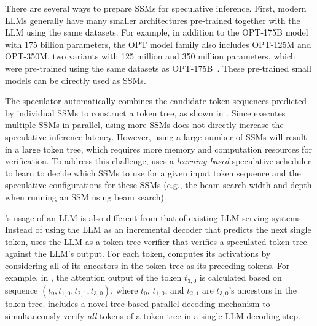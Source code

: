 There are several ways to prepare SSMs for speculative inference. 
First, modern LLMs generally have many smaller architectures pre-trained together with the LLM using the same datasets. 
For example, in addition to the OPT-175B model with 175 billion parameters, the OPT model family also includes OPT-125M and OPT-350M, two variants with 125 million and 350 million parameters, which were pre-trained using the same datasets as OPT-175B~\cite{zhang2022opt}.
These pre-trained small models can be directly used as SSMs. 

The speculator automatically combines the candidate token sequences predicted by individual SSMs to construct a token tree, as shown in .
Since \sys executes multiple SSMs in parallel, using more SSMs does not directly increase the speculative inference latency.
However, using a large number of SSMs will result in a large token tree, which requires more memory and computation resources for verification.
To address this challenge, \sys uses a {\em learning-based} speculative scheduler to learn to decide which SSMs to use for a given input token sequence and the speculative configurations for these SSMs (e.g., the beam search width and depth when running an SSM using beam search).
\fi

\Sys's usage of an LLM is also different from that of existing LLM serving systems. 
Instead of using the LLM as an incremental decoder that predicts the next single token, \sys uses the LLM as a token tree verifier that verifies a speculated token tree against the LLM's output.
For each token, \sys computes its activations by considering all of its ancestors in the token tree as its preceding tokens.
For example, in , the attention output of the token $t_{3,0}$ is calculated based on sequence $(t_0, t_{1,0}, t_{2, 1}, t_{3,0})$, where $t_0$, $t_{1,0}$, and $t_{2,1}$ are $t_{3,0}$'s ancestors in the token tree.
\Sys includes a novel tree-based parallel decoding mechanism to simultaneously verify {\em all} tokens of a token tree in a single LLM decoding step.

